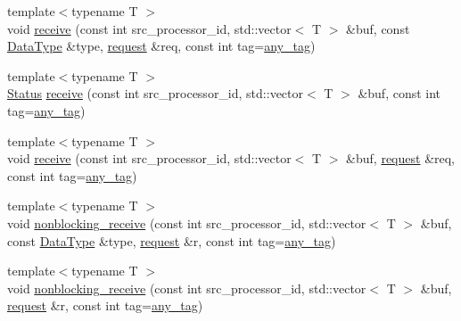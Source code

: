 \begin{DoxyCompactItemize}
\item 
{\footnotesize template$<$typename T $>$ }\\void \mbox{\hyperlink{namespacefemus_1_1_parallel_a6c79d178dc5c5f64ac623f0f5a2a0ea2}{receive}} (const int src\+\_\+processor\+\_\+id, std\+::vector$<$ T $>$ \&buf, const \mbox{\hyperlink{classfemus_1_1_parallel_1_1_data_type}{Data\+Type}} \&type, \mbox{\hyperlink{structfemus_1_1_parallel_1_1request}{request}} \&req, const int tag=\mbox{\hyperlink{namespacefemus_1_1_parallel_a928996065f46cb52e89e132cdcb30328}{any\+\_\+tag}})
\item 
{\footnotesize template$<$typename T $>$ }\\\mbox{\hyperlink{classfemus_1_1_parallel_1_1_status}{Status}} \mbox{\hyperlink{namespacefemus_1_1_parallel_a49e65f1574362935e9c7e1d048e9aa3a}{receive}} (const int src\+\_\+processor\+\_\+id, std\+::vector$<$ T $>$ \&buf, const int tag=\mbox{\hyperlink{namespacefemus_1_1_parallel_a928996065f46cb52e89e132cdcb30328}{any\+\_\+tag}})
\item 
{\footnotesize template$<$typename T $>$ }\\void \mbox{\hyperlink{namespacefemus_1_1_parallel_ac38ae778cd7241660643837071894115}{receive}} (const int src\+\_\+processor\+\_\+id, std\+::vector$<$ T $>$ \&buf, \mbox{\hyperlink{structfemus_1_1_parallel_1_1request}{request}} \&req, const int tag=\mbox{\hyperlink{namespacefemus_1_1_parallel_a928996065f46cb52e89e132cdcb30328}{any\+\_\+tag}})
\item 
{\footnotesize template$<$typename T $>$ }\\void \mbox{\hyperlink{namespacefemus_1_1_parallel_ab43a0be42a037601024dba3d07f43721}{nonblocking\+\_\+receive}} (const int src\+\_\+processor\+\_\+id, std\+::vector$<$ T $>$ \&buf, const \mbox{\hyperlink{classfemus_1_1_parallel_1_1_data_type}{Data\+Type}} \&type, \mbox{\hyperlink{structfemus_1_1_parallel_1_1request}{request}} \&r, const int tag=\mbox{\hyperlink{namespacefemus_1_1_parallel_a928996065f46cb52e89e132cdcb30328}{any\+\_\+tag}})
\item 
{\footnotesize template$<$typename T $>$ }\\void \mbox{\hyperlink{namespacefemus_1_1_parallel_a6fc899af0b0588c9f0827e1a5e1fe8f1}{nonblocking\+\_\+receive}} (const int src\+\_\+processor\+\_\+id, std\+::vector$<$ T $>$ \&buf, \mbox{\hyperlink{structfemus_1_1_parallel_1_1request}{request}} \&r, const int tag=\mbox{\hyperlink{namespacefemus_1_1_parallel_a928996065f46cb52e89e132cdcb30328}{any\+\_\+tag}})
\item 

\end{DoxyCompactItemize}
